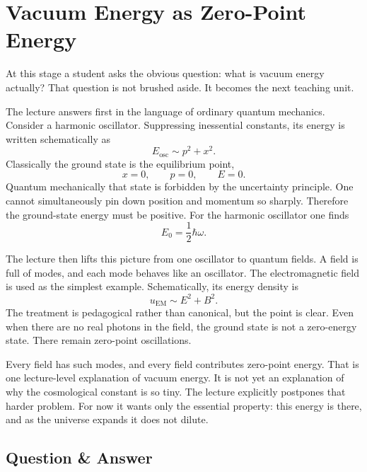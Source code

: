 \section{Vacuum Energy as Zero-Point Energy}

At this stage a student asks the obvious question: what is vacuum energy actually? That question is not brushed aside. It becomes the next teaching unit.

The lecture answers first in the language of ordinary quantum mechanics. Consider a harmonic oscillator. Suppressing inessential constants, its energy is written schematically as
\begin{equation}
E_{\mathrm{osc}}\sim p^2+x^2.
\end{equation}
Classically the ground state is the equilibrium point,
\begin{equation}
x=0,\qquad p=0,\qquad E=0.
\end{equation}
Quantum mechanically that state is forbidden by the uncertainty principle. One cannot simultaneously pin down position and momentum so sharply. Therefore the ground-state energy must be positive. For the harmonic oscillator one finds
\begin{equation}
E_0=\frac{1}{2}\hbar\omega.
\end{equation}

The lecture then lifts this picture from one oscillator to quantum fields. A field is full of modes, and each mode behaves like an oscillator. The electromagnetic field is used as the simplest example. Schematically, its energy density is
\begin{equation}
u_{\mathrm{EM}}\sim E^2+B^2.
\end{equation}
The treatment is pedagogical rather than canonical, but the point is clear. Even when there are no real photons in the field, the ground state is not a zero-energy state. There remain zero-point oscillations.

Every field has such modes, and every field contributes zero-point energy. That is one lecture-level explanation of vacuum energy. It is not yet an explanation of why the cosmological constant is so tiny. The lecture explicitly postpones that harder problem. For now it wants only the essential property: this energy is there, and as the universe expands it does not dilute.

\subsection{Question \& Answer}

